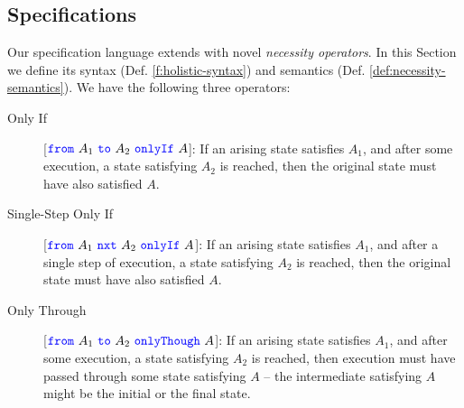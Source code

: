 \subsection {\Nec Specifications}
\label{s:holistic-guarantees}

Our \Nec specification language extends \SpecO with novel 
 \emph{necessity operators}.
In this Section we define its syntax (Def. \ref{f:holistic-syntax}) and semantics 
(Def. \ref{def:necessity-semantics}).
We have the following three operators:
 



\begin{description}
\item[Only If]
[${\color{blue}\texttt{from}}\ A_1\ {\color{blue}\texttt{to}}\ A_2\ {\color{blue}\texttt{onlyIf}}\ A$]: If an arising %
  state satisfies $A_1$, and after some execution, a state %
 satisfying $A_2$ is reached, 
then the original  
state must have also satisfied $A$.
 \sophiaPonder[chopped]{}
\item[Single-Step Only If]
[${\color{blue}\texttt{from}}\ A_1\ {\color{blue}\texttt{nxt}}\ A_2\ {\color{blue}\texttt{onlyIf}}\ A$]: If an arising %
  state satisfies $A_1$, and after a single step of execution, a state satisfying $A_2$ is reached, 
then the original %
state must have also satisfied $A$.
\sophiaPonder[chopped]{}

\item[Only Through]
[${\color{blue}\texttt{from}}\ A_1\ {\color{blue}\texttt{to}}\ A_2\ {\color{blue}\texttt{onlyThough}}\ A$]: If an arising %
 state satisfies $A_1$, and after some execution, a state satisfying $A_2$ is reached, then  execution must have passed through some state satisfying $A$ 
\sophiaPonder[chopped]{}
--  the   intermediate %
satisfying $A$ might be the initial  
or the final state.
\end{description} 

